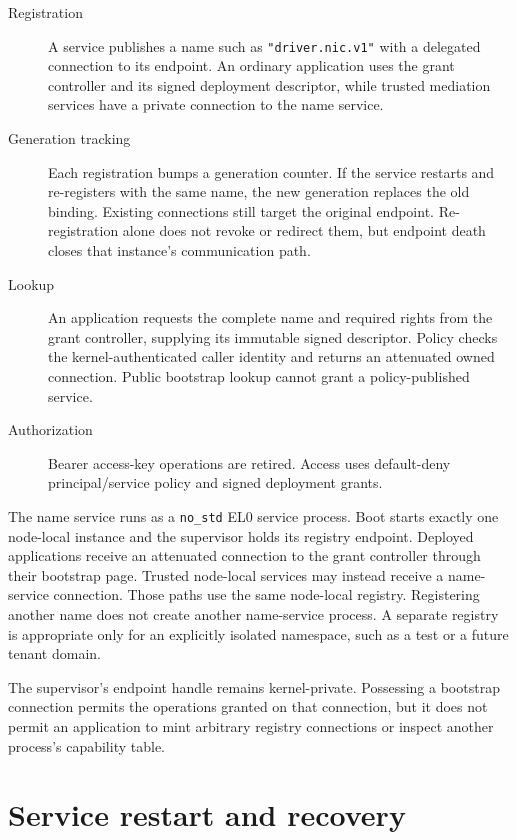 \begin{description}
    \item[Registration] A service publishes a name such as
        \texttt{"driver.nic.v1"} with a delegated connection to its endpoint.
        An ordinary application uses the grant controller and its signed
        deployment descriptor, while trusted mediation services have a private
        connection to the name service.
    \item[Generation tracking] Each registration bumps a generation counter.
        If the service restarts and re-registers with the same name, the new
        generation replaces the old binding. Existing connections still target
        the original endpoint. Re-registration alone does not revoke or redirect
        them, but endpoint death closes that instance's communication path.
    \item[Lookup] An application requests the complete name and required rights
        from the grant controller, supplying its immutable signed descriptor.
        Policy checks the kernel-authenticated caller identity and returns an
        attenuated owned connection. Public bootstrap lookup cannot grant a
        policy-published service.
    \item[Authorization] Bearer access-key operations are retired. Access uses
        default-deny principal/service policy and signed deployment grants.
\end{description}

The name service runs as a \texttt{no\_std} EL0 service process. Boot starts
exactly one node-local instance and the supervisor holds its registry
endpoint. Deployed applications receive an attenuated connection to the grant
controller through their bootstrap page. Trusted node-local services may instead
receive a name-service connection. Those paths use the same
node-local registry. Registering another name does not create
another name-service process. A separate registry is appropriate only for an
explicitly isolated namespace, such as a test or a future tenant domain.

The supervisor's endpoint handle remains kernel-private. Possessing a
bootstrap connection permits the operations granted on that connection, but it
does not permit an application to mint arbitrary registry connections or
inspect another process's capability table.

\section{Service restart and recovery}

